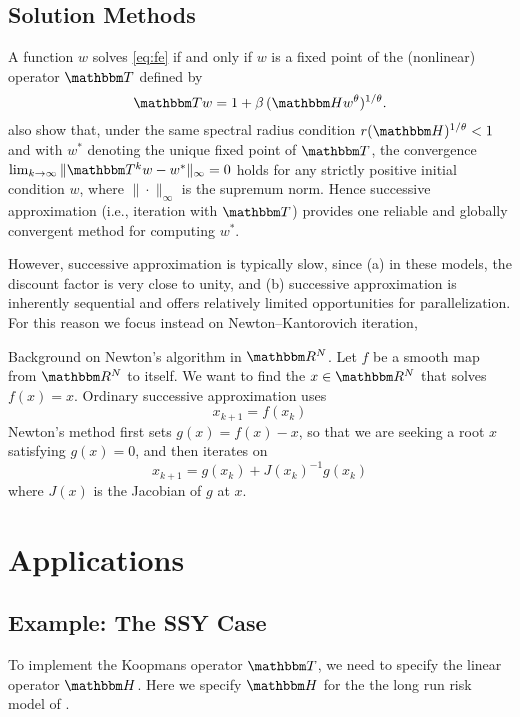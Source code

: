 \documentclass[12pt, reqno]{amsart}
\newcommand{\1}{\mathbbm 1}
\newcommand{\RR}{\mathbbm R}
\newcommand{\TT}{\mathbbm T}
\newcommand{\HH}{\mathbbm H}
\theoremstyle{plain}
\theoremstyle{definition}
\begin{document}
\subsection{Solution Methods}

A function $w$ solves \eqref{eq:fe} if and only if $w$ is a fixed point
of the (nonlinear) operator $\TT$ defined by 
%
\begin{equation}\label{eq:wcop}
    \TT w = 1 + \beta \,  (\HH w^\theta)^{1/\theta}.
\end{equation}
%
\cite{stachurski2022unique} also show that, under the same spectral radius condition
$r(\HH)^{1/\theta} < 1$ and with $w^*$ denoting the unique fixed point of $\TT$,
the convergence $\lim_{k \to \infty} \| \TT^k w - w^*\|_\infty = 0$ holds for any
strictly positive initial condition $w$, where $\| \cdot \|_\infty$ is the
supremum norm. Hence successive approximation (i.e., iteration with $\TT$)
provides one reliable and globally convergent method for computing $w^*$.

However, successive approximation is typically slow, since (a) in these models, the
discount factor is very close to unity, and (b) successive approximation is
inherently sequential and offers relatively limited opportunities for
parallelization.  For this reason we focus instead on Newton--Kantorovich
iteration,  

Background on Newton's algorithm in $\RR^N$.  Let $f$ be a smooth map from
$\RR^N$ to itself.  We want to find the $x \in \RR^N$ that solves $f(x)=x$.
Ordinary successive approximation uses
%
\begin{equation}
    x_{k+1} = f(x_k)
\end{equation}
%
Newton's method first sets $g(x) = f(x) -x$, so that we are seeking a root $x$
satisfying $g(x)=0$, and then iterates on
%
\begin{equation}
    x_{k+1} = g(x_k) + J(x_k)^{-1} g(x_k)
\end{equation}
%
where $J(x)$ is the Jacobian of $g$ at $x$.



\section{Applications}

\subsection{Example: The SSY Case}

To implement the Koopmans operator $\TT$, we need to specify the linear operator
$\HH$.  Here we specify $\HH$ for the 
the long run risk model of \cite{schorfheide2018identifying}.  
\end{document}
